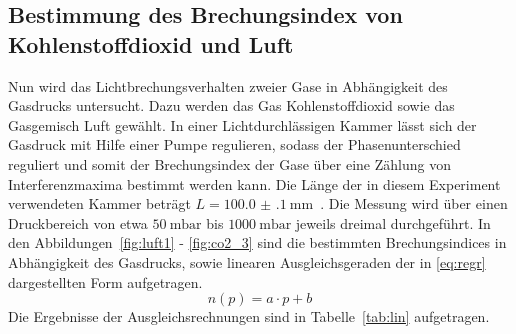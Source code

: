 \subsection{Bestimmung des Brechungsindex von Kohlenstoffdioxid und Luft}
%
Nun wird das Lichtbrechungsverhalten zweier Gase in Abhängigkeit des Gasdrucks
untersucht. Dazu werden das Gas Kohlenstoffdioxid sowie das Gasgemisch Luft
gewählt. In einer Lichtdurchlässigen Kammer lässt sich der Gasdruck mit Hilfe
einer Pumpe regulieren, sodass der Phasenunterschied reguliert und somit der
Brechungsindex der Gase über eine Zählung von Interferenzmaxima bestimmt werden
kann. Die Länge der in diesem Experiment verwendeten Kammer beträgt
$L=\SI{100.0(1)}{\milli\meter}$~\cite{V64}. Die Messung wird über einen
Druckbereich von etwa $\SI{50}{\milli\bar}$ bis $\SI{1000}{\milli\bar}$ jeweils
dreimal durchgeführt. In den Abbildungen~\ref{fig:luft1} - \ref{fig:co2_3} sind die bestimmten
Brechungsindices in Abhängigkeit des Gasdrucks, sowie linearen Ausgleichsgeraden der in \eqref{eq:regr} dargestellten Form aufgetragen.
%
\begin{equation}
  n(p)=a\cdot p + b
  \label{eq:regr}
\end{equation}
%
Die Ergebnisse der Ausgleichsrechnungen sind in Tabelle~\ref{tab:lin} aufgetragen.

